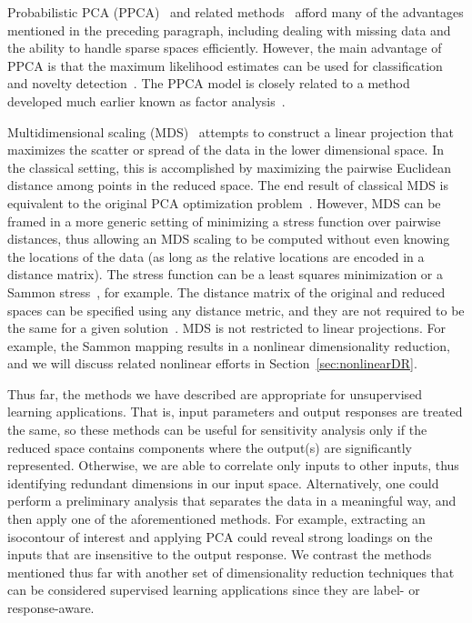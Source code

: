Probabilistic PCA (PPCA)~\cite{TippingBishop1999} and related methods~\cite{Roweis1998,WellingAgakovWilliams2003,WilliamsAgakov2002} afford many of the advantages mentioned in the preceding paragraph, including dealing with missing data and the ability to handle sparse spaces efficiently.
%
However, the main advantage of PPCA is that the maximum likelihood estimates can be used for classification and novelty detection~\cite{TippingBishop1999}.
%
The PPCA model is closely related to a method developed much earlier known as factor analysis~\cite{Spearman1904b}.

Multidimensional scaling (MDS)~\cite{BorgGroenen2005,CoxCox2000,Torgerson1952} attempts to construct a linear projection that maximizes the scatter or spread of the data in the lower dimensional space.
%
In the classical setting, this is accomplished by maximizing the pairwise Euclidean distance among points in the reduced space.
%
The end result of classical MDS is equivalent to the original PCA optimization problem~\cite{BorgGroenen2005,CoxCox2000,MardiaKentBibby1979,Williams2002}.
%
However, MDS can be framed in a more generic setting of minimizing a stress function over pairwise distances, thus allowing an MDS scaling to be computed without even knowing the locations of the data (as long as the relative locations are encoded in a distance matrix).
%
The stress function can be a least squares minimization or a Sammon stress~\cite{Sammon1969}, for example.
%
The distance matrix of the original and reduced spaces can be specified using any distance metric, and they are not required to be the same for a given solution~\cite{CunninghamGhahramani2015}.
%
MDS is not restricted to linear projections.
%
For example, the Sammon mapping results in a nonlinear dimensionality reduction, and we will discuss related nonlinear efforts in Section~\ref{sec:nonlinearDR}.

Thus far, the methods we have described are appropriate for unsupervised learning applications.
%
That is, input parameters and output responses are treated the same, so these methods can be useful for sensitivity analysis only if the reduced space contains components where the output(s) are significantly represented.
%
Otherwise, we are able to correlate only inputs to other inputs, thus identifying redundant dimensions in our input space.
%
Alternatively, one could perform a preliminary analysis that separates the data in a meaningful way, and then apply one of the aforementioned methods.
%
For example, extracting an isocontour of interest and applying PCA could reveal strong loadings on the inputs that are insensitive to the output response.
%
We contrast the methods mentioned thus far with another set of dimensionality reduction techniques that can be considered supervised learning applications since they are label- or response-aware.

